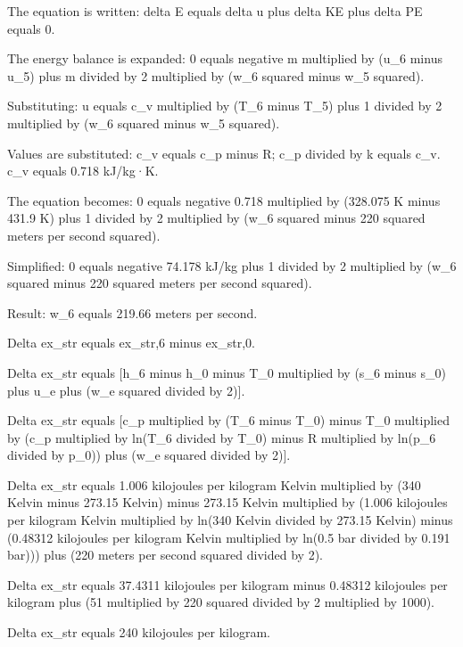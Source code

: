The equation is written:  
delta E equals delta u plus delta KE plus delta PE equals 0.  

The energy balance is expanded:  
0 equals negative m multiplied by (u_6 minus u_5) plus m divided by 2 multiplied by (w_6 squared minus w_5 squared).  

Substituting:  
u equals c_v multiplied by (T_6 minus T_5) plus 1 divided by 2 multiplied by (w_6 squared minus w_5 squared).  

Values are substituted:  
c_v equals c_p minus R; c_p divided by k equals c_v.  
c_v equals 0.718 kJ/kg·K.  

The equation becomes:  
0 equals negative 0.718 multiplied by (328.075 K minus 431.9 K) plus 1 divided by 2 multiplied by (w_6 squared minus 220 squared meters per second squared).  

Simplified:  
0 equals negative 74.178 kJ/kg plus 1 divided by 2 multiplied by (w_6 squared minus 220 squared meters per second squared).  

Result:  
w_6 equals 219.66 meters per second.

Delta ex_str equals ex_str,6 minus ex_str,0.  

Delta ex_str equals [h_6 minus h_0 minus T_0 multiplied by (s_6 minus s_0) plus u_e plus (w_e squared divided by 2)].  

Delta ex_str equals [c_p multiplied by (T_6 minus T_0) minus T_0 multiplied by (c_p multiplied by ln(T_6 divided by T_0) minus R multiplied by ln(p_6 divided by p_0)) plus (w_e squared divided by 2)].  

Delta ex_str equals 1.006 kilojoules per kilogram Kelvin multiplied by (340 Kelvin minus 273.15 Kelvin) minus 273.15 Kelvin multiplied by (1.006 kilojoules per kilogram Kelvin multiplied by ln(340 Kelvin divided by 273.15 Kelvin) minus (0.48312 kilojoules per kilogram Kelvin multiplied by ln(0.5 bar divided by 0.191 bar))) plus (220 meters per second squared divided by 2).  

Delta ex_str equals 37.4311 kilojoules per kilogram minus 0.48312 kilojoules per kilogram plus (51 multiplied by 220 squared divided by 2 multiplied by 1000).  

Delta ex_str equals 240 kilojoules per kilogram.